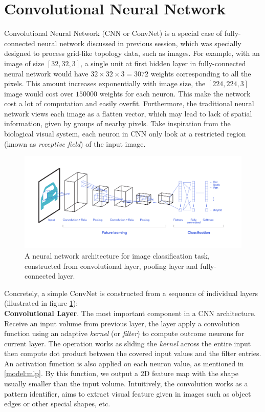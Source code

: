 \section{Convolutional Neural Network}
\label{model:cnn}
Convolutional Neural Network (CNN or ConvNet) is a special case of fully-connected neural network discussed in previous session, which was specially designed to process grid-like topology data, such as images.
For example, with an image of size $[32, 32, 3]$, a single unit at first hidden layer in fully-connected neural network would have $32 \times 32 \times 3 = 3072$ weights corresponding to all the pixels. 
This amount increases exponentially with image size, the $[224, 224, 3]$ image would cost over $150000$ weights for each neuron. 
This make the network cost a lot of computation and easily overfit.
Furthermore, the traditional neural network views each image as a flatten vector, which may lead to lack of spatial information, given by groups of nearby pixels. Take inspiration from the biological visual system, each neuron in CNN only look at a restricted region (known as \textit{receptive field}) of the input image. \\
\begin{figure}[t!]
    \centering
    \includegraphics[width=\textwidth]{resources/images/CNN.png}
    \caption{A neural network architecture for image classification task, constructed from convolutional layer, pooling layer and fully-connected layer.}
    \label{fig:cnn}
\end{figure}
Concretely, a simple ConvNet is constructed from a sequence of individual layers (illustrated in figure \ref{fig:cnn}): \\
\textbf{Convolutional Layer}. \quad The most important component in a CNN architecture. Receive an input volume from previous layer, the layer apply a convolution function using an adaptive \textit{kernel} (or \textit{filter}) to compute outcome neurons for current layer. The operation works as sliding the \textit{kernel} across the entire input then compute dot product between the covered input values and the filter entries. An activation function is also applied on each neuron value, as mentioned in \ref{model:mlp}. By this function, we output a 2D feature map with the shape usually smaller than the input volume. Intuitively, the convolution works as a pattern identifier, aims to extract visual feature given in images such as object edges or other special shapes, etc. \\
